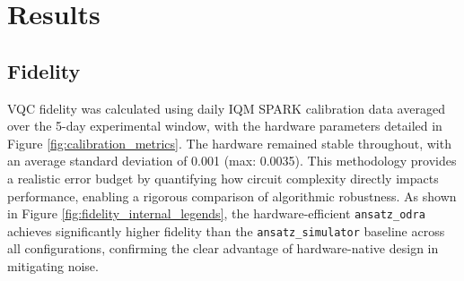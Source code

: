 \documentclass[11pt]{article}
\begin{document}
\section{Results}

\subsection{Fidelity}
VQC fidelity was calculated using daily IQM SPARK calibration data averaged over the 5-day experimental window, with the hardware parameters detailed in Figure \ref{fig:calibration_metrics}. The hardware remained stable throughout, with an average standard deviation of 0.001 (max: 0.0035). This methodology provides a realistic error budget by quantifying how circuit complexity directly impacts performance, enabling a rigorous comparison of algorithmic robustness. As shown in Figure \ref{fig:fidelity_internal_legends}, the hardware-efficient \texttt{ansatz\_odra} achieves significantly higher fidelity than the \texttt{ansatz\_simulator} baseline across all configurations, confirming the clear advantage of hardware-native design in mitigating noise.
\end{document}
